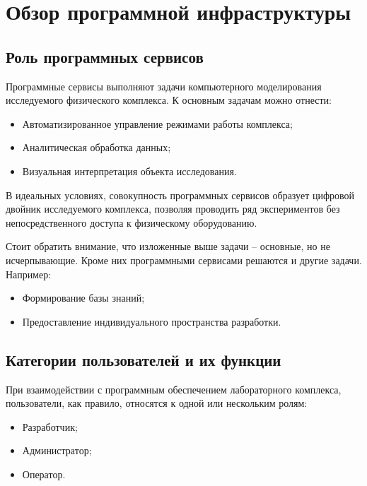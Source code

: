 \documentclass[../thesis.tex]{subfiles}
\begin{document}
	\section{Обзор программной инфраструктуры}

	\subsection{Роль программных сервисов}

	Программные сервисы выполняют задачи компьютерного моделирования исследуемого физического комплекса.
	К основным задачам можно отнести:

	\begin{itemize}
		\item Автоматизированное управление режимами работы комплекса;

		\item Аналитическая обработка данных;

		\item Визуальная интерпретация объекта исследования.
	\end{itemize}

	В идеальных условиях, совокупность программных сервисов образует цифровой двойник исследуемого
	комплекса, позволяя проводить ряд экспериментов без непосредственного доступа к физическому оборудованию.

	Стоит обратить внимание, что изложенные выше задачи -- основные, но не исчерпывающие. Кроме них программными
	сервисами решаются и другие задачи. Например:

	\begin{itemize}
		\item Формирование базы знаний;

		\item Предоставление индивидуального пространства разработки.
	\end{itemize}

	\subsection{Категории пользователей и их функции}

	При взаимодействии с программным обеспечением лабораторного комплекса, пользователи, как правило,
	относятся к одной или нескольким ролям:

	\begin{itemize}
		\item Разработчик;

		\item Администратор;

		\item Оператор.
	\end{itemize}
\end{document}

